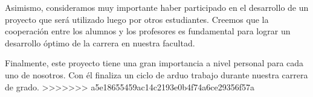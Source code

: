 Asimismo, consideramos muy importante haber participado en el desarrollo de un
proyecto que será utilizado luego por otros estudiantes.
Creemos que la cooperación entre los alumnos y los profesores es fundamental
para lograr un desarrollo óptimo de la carrera en nuestra facultad.

Finalmente, este proyecto tiene una gran importancia a nivel personal para cada
uno de nosotros.
Con él finaliza un ciclo de arduo trabajo durante nuestra
carrera de grado.
>>>>>>> a5e18655459ac14c2193e0b4f74a6ce29356f57a

